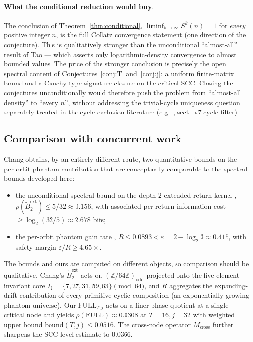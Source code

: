 \documentclass[11pt,a4paper]{article}
\theoremstyle{definition}
\newcommand{\Z}{\mathbb{Z}}
\newcommand{\full}{\mathrm{FULL}}
\newcommand{\spec}{\rho}
\begin{document}
\paragraph{What the conditional reduction would buy.}
The conclusion of Theorem~\ref{thm:conditional},
$\liminf_{k\to\infty} S^k(n) = 1$ for \emph{every} positive
integer $n$, is the full Collatz convergence statement (one
direction of the conjecture). This is qualitatively stronger than
the unconditional ``almost-all'' result of Tao
\cite{tao2019} --- which asserts only logarithmic-density
convergence to almost bounded values. The price of the stronger
conclusion is precisely the open spectral content of
Conjectures~\ref{conj:T} and~\ref{conj:j}: a uniform finite-matrix
bound and a Cauchy-type signature closure on the critical SCC.
Closing the conjectures unconditionally would therefore push the
problem from ``almost-all density'' to ``every $n$'', without
addressing the trivial-cycle uniqueness question separately
treated in the cycle-exclusion literature
(e.g.\ \cite{chang2026}, sect.~v7 cycle filter).

\subsection{Comparison with concurrent work}
\label{sec:comparison}

Chang \cite{chang2026} obtains, by an entirely different route, two
quantitative bounds on the per-orbit phantom contribution that are
conceptually comparable to the spectral bounds developed here:
\begin{itemize}
  \item the unconditional spectral bound on the depth-$2$ extended
        return kernel \cite[Theorem~C.3]{chang2026},
        $\spec(\widetilde{B}_2^{\mathrm{ext}}) \le 5/32 \approx 0.156$,
        with associated per-return information cost
        $\ge \log_2(32/5) \approx 2.678$ bits;
  \item the per-orbit phantom gain rate
        \cite[Theorem~7.19]{chang2026},
        $R \le 0.0893 < \varepsilon = 2 - \log_2 3 \approx 0.415$,
        with safety margin $\varepsilon / R \ge 4.65\times$.
\end{itemize}
The bounds and ours are computed on different objects, so
comparison should be qualitative. Chang's $\widetilde{B}_2^{\mathrm{ext}}$
acts on $(\Z/64\Z)_{\mathrm{odd}}$ projected onto the
five-element invariant core $I_2 = \{7, 27, 31, 59, 63\} \pmod{64}$,
and $R$ aggregates the expanding-drift contribution of every
primitive cyclic composition (an exponentially growing phantom
universe). Our $\full_{T,j}$ acts on a finer phase quotient at a
single critical node and yields
$\spec(\full) \approx 0.0308$ at $T = 16, j = 32$ with weighted
upper bound $\mathrm{bound}(T,j) \le 0.0516$. The cross-node
operator $M_{\mathrm{cross}}$ further sharpens the SCC-level
estimate to $0.0366$.
\end{document}
